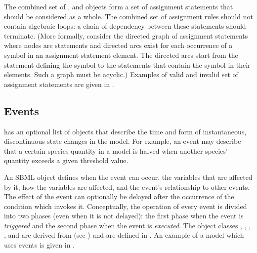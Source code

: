 The combined set of \InitialAssignment, \AssignmentRule and
\KineticLaw objects form a set of assignment statements that
should be considered as a whole.  The combined set of assignment
rules should not contain algebraic loops: a chain of dependency
between these statements should terminate.  (More formally,
consider the directed graph of assignment statements where nodes
are statements and directed arcs exist for each occurrence of a
symbol in an assignment statement  element. The
directed arcs start from the statement defining the symbol to the
statements that contain the symbol in their  elements. Such a
graph must be acyclic.)  Examples of valid and invalid set of
assignment statements are given in
.


\subsection{Events}
\label{sec:events}

\Model has an optional list of \Event objects that describe the
time and form of instantaneous, discontinuous state changes in the
model.  For example, an event may describe that a certain species
quantity in a model is halved when another species' quantity
exceeds a given threshold value.

An SBML \Event object defines when the event can occur, the
variables that are affected by it, how the variables are affected,
and the event's relationship to other events.  The effect of the
event can optionally be delayed after the occurrence of the
condition which invokes it.  Conceptually, the operation of every
event is divided into two phases (even when it is not delayed):
the first phase when the event is \emph{triggered} and the second
phase when the event is \emph{executed}.  The object classes
\Event, \Trigger, \Delay, \Priority, \EventAssignment and
\ListOfEventAssignments are derived from \SBase{} (see
) and are defined in
.  An example of a model which uses events
is given in .

